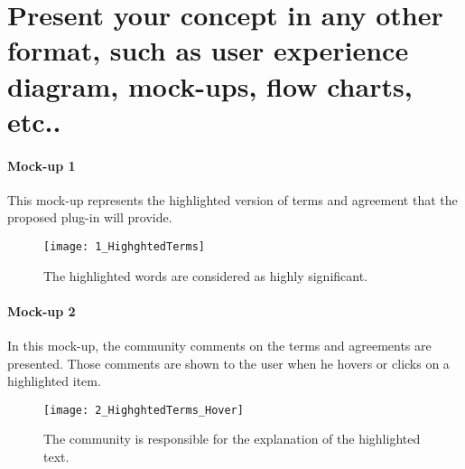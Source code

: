 \section{Present your concept in any other format, such as user experience 
diagram, mock-ups, flow charts, etc..}
\label{s_5}

\paragraph{Mock-up 1}
This mock-up represents the highlighted version of terms and agreement that the 
proposed plug-in will provide.

\begin{figure}[H]
\centering
\texttt{[image: 1\_HighghtedTerms]}
\caption{The highlighted words are considered as highly significant.}
\end{figure}

\paragraph{Mock-up 2}
In this mock-up, the community comments on the terms and agreements are 
presented. Those comments are shown to the user when he hovers or clicks on a 
highlighted item.

\begin{figure}[H]
\centering
\texttt{[image: 2\_HighghtedTerms\_Hover]}
\caption{The community is responsible for the explanation of the highlighted 
text.}
\end{figure}


